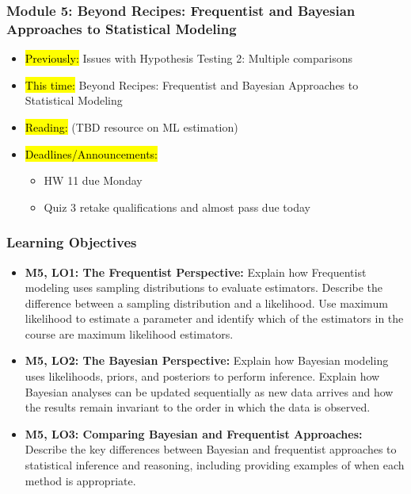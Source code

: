 
\begin{frame}
    \frametitle{Module 5: Beyond Recipes: Frequentist and Bayesian Approaches to Statistical Modeling}
    \begin{itemize}
        \item \hl{Previously: }Issues with Hypothesis Testing 2: Multiple comparisons
        \item \hl{This time: }Beyond Recipes: Frequentist and Bayesian Approaches to Statistical Modeling
        \item \hl{Reading: }(TBD resource on ML estimation)
        \item \hl{Deadlines/Announcements: }
        \begin{itemize}
            \item HW 11 due Monday
            \item Quiz 3 retake qualifications and almost pass due today
        \end{itemize}
    \end{itemize}

\end{frame}

\begin{frame}
    \frametitle{Learning Objectives}
    \begin{itemize}
        \item \textbf{M5, LO1: The Frequentist Perspective:} Explain how Frequentist modeling uses sampling distributions to evaluate estimators. Describe the difference between a sampling distribution and a likelihood. Use maximum likelihood to estimate a parameter and identify which of the estimators in the course are maximum likelihood estimators.
        \item \textbf{M5, LO2: The Bayesian Perspective:} Explain how Bayesian modeling uses likelihoods, priors, and posteriors to perform inference. Explain how Bayesian analyses can be updated sequentially as new data arrives and how the results remain invariant to the order in which the data is observed.
        \item \textbf{M5, LO3: Comparing Bayesian and Frequentist Approaches:} Describe the key differences between Bayesian and frequentist approaches to statistical inference and reasoning, including providing examples of when each method is appropriate.
    \end{itemize}
\end{frame}
